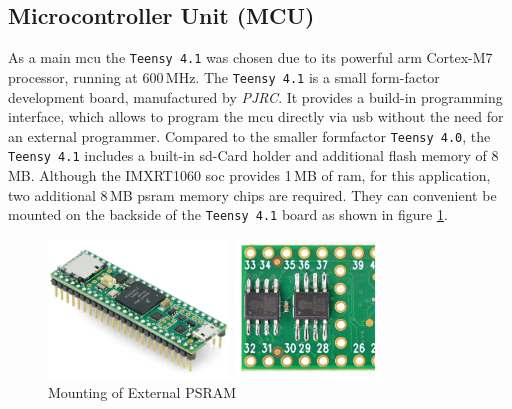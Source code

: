 \subsection{Microcontroller Unit (MCU)}
As a main \acrshort{mcu} the \texttt{Teensy 4.1} was chosen due to its powerful \acrshort{arm} Cortex-M7 processor, running at 600\,MHz.
The \texttt{Teensy 4.1} is a small form-factor development board, manufactured by \textit{PJRC}.
It provides a build-in programming interface, which allows to program the \acrshort{mcu} directly via \acrshort{usb} without the need for an external programmer.
Compared to the smaller formfactor \texttt{Teensy 4.0}, the \texttt{Teensy 4.1} includes a built-in \acrshort{sd}-Card holder and additional flash memory of 8\,MB.
Although the IMXRT1060 \acrshort{soc} provides 1\,MB of \acrshort{ram}, for this application, two additional 8\,MB \acrshort{psram} memory chips are required.
They can convenient be mounted on the backside of the \texttt{Teensy 4.1} board as shown in figure \ref{fig:teensy_psram}.
\begin{figure}[h!]
	\centering
	\begin{minipage}{0.49\textwidth}
		\centering
		\includegraphics[height=3.7cm]{images/4_design_acquisition_system/teensy_image.png}
		\vspace{-0.2cm}
		\caption{Teensy 4.1}
		\label{fig:teensy_4_1}
	\end{minipage}
	\begin{minipage}{0.49\textwidth}
		\centering
		\includegraphics[height=3.7cm]{images/4_design_acquisition_system/teensy_psram.png}
		\vspace{-0.2cm}
		\caption{Mounting of External PSRAM}
		\label{fig:teensy_psram}
	\end{minipage}
\end{figure}
\newpage

